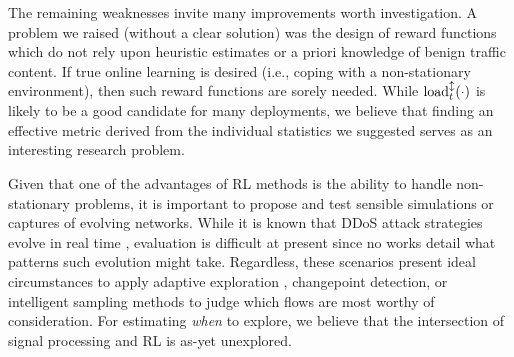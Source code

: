 \documentclass[10pt, times, comsoc]{IEEEtran}
\begin{document}
The remaining weaknesses invite many improvements worth investigation.
A problem we raised (without a clear solution) was the design of reward functions which do not rely upon heuristic estimates or a priori knowledge of benign traffic content.
If true online learning is desired (i.e., coping with a non-stationary environment), then such reward functions are sorely needed.
While $\operatorname{load}^{\updownarrow}_{t}(\cdot)$ is likely to be a good candidate for many deployments, we believe that finding an effective metric derived from the individual statistics we suggested serves as an interesting research problem.

Given that one of the advantages of RL methods is the ability to handle non-stationary problems, it is important to propose and test sensible simulations or captures of evolving networks.
While it is known that DDoS attack strategies evolve in real time \cite{DBLP:conf/spw/KangGS16}, evaluation is difficult at present since no works detail what patterns such evolution might take.
Regardless, these scenarios present ideal circumstances to apply adaptive exploration \cite{DBLP:conf/annpr/TokicP12}, changepoint detection, or intelligent sampling methods to judge which flows are most worthy of consideration.
For estimating \emph{when} to explore, we believe that the intersection of signal processing and RL is as-yet unexplored.
\end{document}
